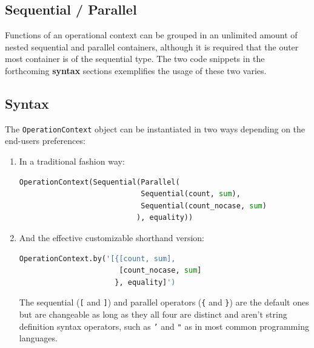 \subsection{Sequential / Parallel}
Functions of an operational context can be grouped in an unlimited amount of nested sequential and parallel containers, although it is required that the outer most container is of the sequential type. The two code snippets in the forthcoming \textbf{syntax} sections exemplifies the usage of these two varies.

\subsection{Syntax}
The \texttt{OperationContext} object can be instantiated in two ways depending on the end-users preferences:
\vspace*{2mm}

\begin{enumerate}
	\item In a traditional fashion way:
\vspace*{2mm}
\begin{lstlisting}[language=Python, basicstyle=\footnotesize, numbers=none, showtabs=false, showstringspaces=false, showspaces=false, 
otherkeywords={[,{,},],Sequential,Parallel,OperationContext}, deletendkeywords={sum}]
OperationContext(Sequential(Parallel(
                            Sequential(count, sum), 
                            Sequential(count_nocase, sum)
                           ), equality))
\end{lstlisting}
\vspace*{-2mm}
	\item And the effective customizable shorthand version:
\vspace*{2mm}
\begin{lstlisting}[language=Python, basicstyle=\footnotesize, numbers=none, showtabs=false, showstringspaces=false, showspaces=false, 
otherkeywords={[,{,},],Sequential,Parallel,OperationContext}, deletendkeywords={sum}]
OperationContext.by('[{[count, sum], 
                       [count_nocase, sum]
                      }, equality]')
\end{lstlisting}
\vspace*{-2mm}
	The sequential (\texttt{[} and \texttt{]}) and parallel operators (\texttt{\{} and \texttt{\}}) are the default ones but are changeable as long as they all four are distinct and aren't string definition syntax operators, such as \texttt{'} and \texttt{"} as in most common programming languages.
\end{enumerate}


